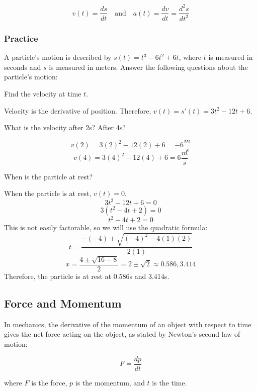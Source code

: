 \begin{equation}
v(t) = \frac{ds}{dt} \quad \text{and} \quad a(t) = \frac{dv}{dt} = \frac{d^2s}{dt^2}
\end{equation}

\subsubsection{Practice}

A particle's motion is described by $s(t) = t^3-6t^2+6t$, where $t$ is measured in seconds and $s$ is measured in meters. Answer the following questions about the particle's motion:
\begin{Exercise}[label=velacc1]
Find the velocity at time $t$.
\end{Exercise}

\begin{Answer}[ref=velacc1]
Velocity is the derivative of position. Therefore, $v(t) = s'(t) = 3t^2-12t+6$.
\end{Answer}

\begin{Exercise}[label=velacc2]
What is the velocity after 2s? After 4s?
\end{Exercise}

\begin{Answer}[ref=velacc2]
$$v(2) = 3(2)^2-12(2)+6=-6 \frac{m}{s}$$
$$v(4) = 3(4)^2-12(4)+6=6\frac{m}{s}$$
\end{Answer}

\begin{Exercise}[label=velacc3]
When is the particle at rest?
\end{Exercise}

\begin{Answer}[ref=velacc3]
When the particle is at rest, $v(t) = 0$. 
$$3t^2-12t+6=0$$
$$3(t^2-4t+2)=0$$
$$t^2-4t+2=0$$
This is not easily factorable, so we will use the quadratic formula: $$t=\frac{-(-4)\pm\sqrt{(-4)^2-4(1)(2)}}{2(1)}$$
$$x=\frac{4\pm\sqrt{16-8}}{2}=2\pm\sqrt{2}\approx0.586, 3.414$$
Therefore, the particle is at rest at 0.586s and 3.414s.
\end{Answer}

\subsection{Force and Momentum}

In mechanics, the derivative of the momentum of an object with respect
to time gives the net force acting on the object, as stated by
Newton's second law of motion:

\begin{equation}
F = \frac{dp}{dt}
\end{equation}

where $F$ is the force, $p$ is the momentum, and $t$ is the time.

